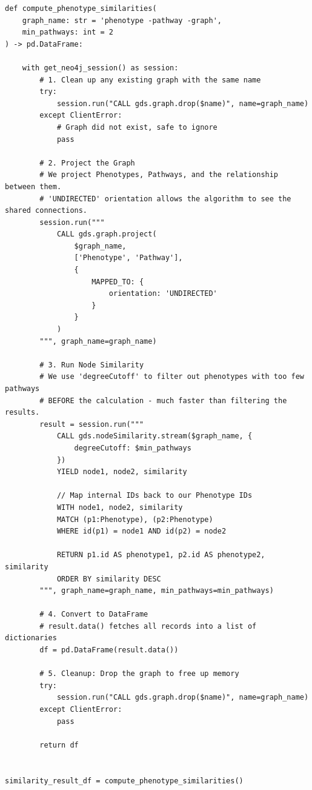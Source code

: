 \begin{lstlisting}[style=Python]
def compute_phenotype_similarities(
    graph_name: str = 'phenotype -pathway -graph',
    min_pathways: int = 2
) -> pd.DataFrame:

    with get_neo4j_session() as session:
        # 1. Clean up any existing graph with the same name
        try:
            session.run("CALL gds.graph.drop($name)", name=graph_name)
        except ClientError:
            # Graph did not exist, safe to ignore
            pass

        # 2. Project the Graph
        # We project Phenotypes, Pathways, and the relationship between them.
        # 'UNDIRECTED' orientation allows the algorithm to see the shared connections.
        session.run("""
            CALL gds.graph.project(
                $graph_name,
                ['Phenotype', 'Pathway'],
                {
                    MAPPED_TO: {
                        orientation: 'UNDIRECTED'
                    }
                }
            )
        """, graph_name=graph_name)

        # 3. Run Node Similarity
        # We use 'degreeCutoff' to filter out phenotypes with too few pathways 
        # BEFORE the calculation - much faster than filtering the results.
        result = session.run("""
            CALL gds.nodeSimilarity.stream($graph_name, {
                degreeCutoff: $min_pathways
            })
            YIELD node1, node2, similarity
            
            // Map internal IDs back to our Phenotype IDs
            WITH node1, node2, similarity
            MATCH (p1:Phenotype), (p2:Phenotype)
            WHERE id(p1) = node1 AND id(p2) = node2
            
            RETURN p1.id AS phenotype1, p2.id AS phenotype2, similarity
            ORDER BY similarity DESC
        """, graph_name=graph_name, min_pathways=min_pathways)

        # 4. Convert to DataFrame
        # result.data() fetches all records into a list of dictionaries
        df = pd.DataFrame(result.data())
        
        # 5. Cleanup: Drop the graph to free up memory
        try:
            session.run("CALL gds.graph.drop($name)", name=graph_name)
        except ClientError:
            pass

        return df


similarity_result_df = compute_phenotype_similarities()
\end{lstlisting}

